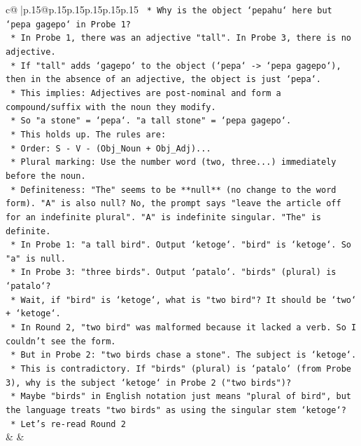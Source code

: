 \documentclass{article}
\begin{document}
{\begin{supertabular}{c@{$\;$}|p{.15\linewidth}@{}p{.15\linewidth}p{.15\linewidth}p{.15\linewidth}p{.15\linewidth}p{.15\linewidth}}
{{{\texttt{    *   Why is the object `pepahu` here but `pepa gagepo` in Probe 1?} \\
\texttt{    *   In Probe 1, there was an adjective "tall". In Probe 3, there is no adjective.} \\
\texttt{    *   If "tall" adds `gagepo` to the object (`pepa` {-}> `pepa gagepo`), then in the absence of an adjective, the object is just `pepa`.} \\
\texttt{    *   This implies: Adjectives are post{-}nominal and form a compound/suffix with the noun they modify.} \\
\texttt{    *   So "a stone" = `pepa`. "a tall stone" = `pepa gagepo`.} \\
\texttt{    *   This holds up. The rules are:} \\
\texttt{        *   Order: S {-} V {-} (Obj\_Noun + Obj\_Adj)...} \\
\texttt{        *   Plural marking: Use the number word (two, three...) immediately before the noun.} \\
\texttt{        *   Definiteness: "The" seems to be **null** (no change to the word form). "A" is also null? No, the prompt says "leave the article off for an indefinite plural". "A" is indefinite singular. "The" is definite.} \\
\texttt{        *   In Probe 1: "a tall bird". Output `ketoge`. "bird" is `ketoge`. So "a" is null.} \\
\texttt{        *   In Probe 3: "three birds". Output `patalo`. "birds" (plural) is `patalo`?} \\
\texttt{        *   Wait, if "bird" is `ketoge`, what is "two bird"? It should be `two` + `ketoge`.} \\
\texttt{        *   In Round 2, "two bird" was malformed because it lacked a verb. So I couldn't see the form.} \\
\texttt{        *   But in Probe 2: "two birds chase a stone". The subject is `ketoge`.} \\
\texttt{        *   This is contradictory. If "birds" (plural) is `patalo` (from Probe 3), why is the subject `ketoge` in Probe 2 ("two birds")?} \\
\texttt{        *   Maybe "birds" in English notation just means "plural of bird", but the language treats "two birds" as using the singular stem `ketoge`?} \\
\texttt{        *   Let's re{-}read Round 2} \\
            }
        }
    }
    & & \\ \\


\end{supertabular}}
\end{document}
